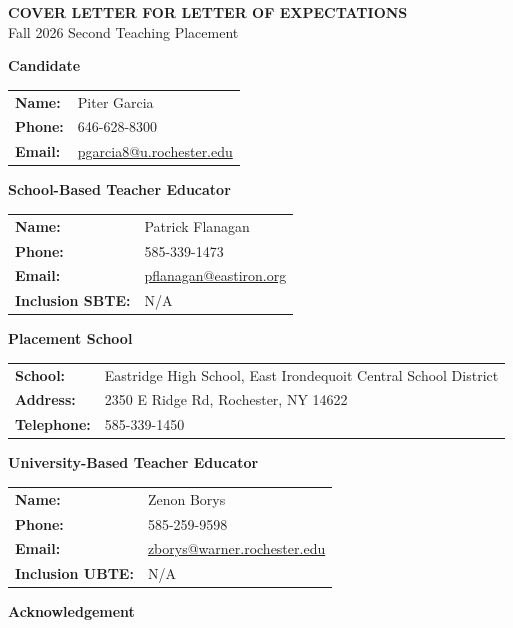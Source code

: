 \documentclass[10pt]{article}
\makeatletter
\newcommand{\CandidateName}{Piter Garcia}
\newcommand{\CandidatePhone}{646-628-8300}
\newcommand{\CandidateEmail}{pgarcia8@u.rochester.edu}
\newcommand{\SBTEName}{Patrick Flanagan}
\newcommand{\SBTEPhone}{585-339-1473}
\newcommand{\SBTEEmail}{pflanagan@eastiron.org}
\newcommand{\SchoolName}{Eastridge High School, East Irondequoit Central School District}
\newcommand{\SchoolAddress}{2350 E Ridge Rd, Rochester, NY 14622}
\newcommand{\SchoolPhone}{585-339-1450}
\newcommand{\UBTEName}{Zenon Borys}
\newcommand{\UBTEPhone}{585-259-9598}
\newcommand{\UBTEEmail}{zborys@warner.rochester.edu}
\makeatother
\begin{document}
\begin{center}
{\Large\bfseries COVER LETTER FOR LETTER OF EXPECTATIONS}\\[3pt]
{\normalsize Fall 2026 Second Teaching Placement}
\end{center}

\small
\textbf{Candidate}\\[1pt]
\begin{tabularx}{\textwidth}{@{}>{\bfseries}p{}X@{}}
Name: & \CandidateName \\
Phone: & \CandidatePhone \\
Email: & \href{mailto:\CandidateEmail}{\CandidateEmail} \\
\end{tabularx}

\vspace{4pt}
\textbf{School-Based Teacher Educator}\\[1pt]
\begin{tabularx}{\textwidth}{@{}>{\bfseries}p{}X@{}}
Name: & \SBTEName \\
Phone: & \SBTEPhone \\
Email: & \href{mailto:\SBTEEmail}{\SBTEEmail} \\
Inclusion SBTE: & N/A \\
\end{tabularx}

\vspace{4pt}
\textbf{Placement School}\\[1pt]
\begin{tabularx}{\textwidth}{@{}>{\bfseries}p{}X@{}}
School: & \SchoolName \\
Address: & \SchoolAddress \\
Telephone: & \SchoolPhone \\
\end{tabularx}

\vspace{4pt}
\textbf{University-Based Teacher Educator}\\[1pt]
\begin{tabularx}{\textwidth}{@{}>{\bfseries}p{}X@{}}
Name: & \UBTEName \\
Phone: & \UBTEPhone \\
Email: & \href{mailto:\UBTEEmail}{\UBTEEmail} \\
Inclusion UBTE: & N/A \\
\end{tabularx}

\vspace{7pt}
\textbf{Acknowledgement}
\end{document}
